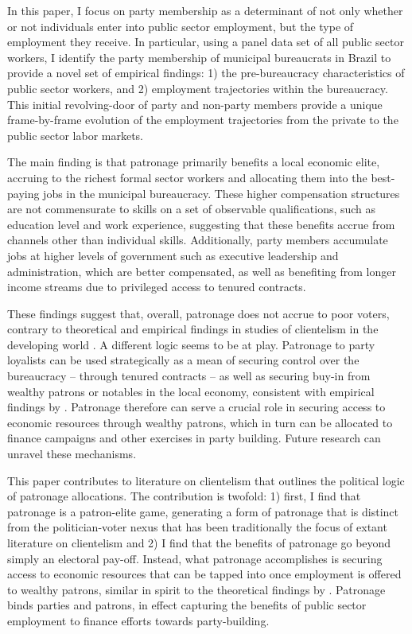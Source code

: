 In this paper, I focus on party membership as a determinant of not only whether or not individuals enter into public sector employment, but the type of employment they receive. In particular, using a panel data set of all public sector workers, I identify the party membership of municipal bureaucrats in Brazil to provide a novel set of empirical findings: 1) the pre-bureaucracy characteristics of public sector workers, and 2) employment trajectories within the bureaucracy. This initial revolving-door of party and non-party members provide a unique frame-by-frame evolution of the employment trajectories from the private to the public sector labor markets.

The main finding is that patronage primarily benefits a local economic elite, accruing to the richest formal sector workers and allocating them into the best-paying jobs in the municipal bureaucracy. These higher compensation structures are not commensurate to skills on a set of observable qualifications, such as education level and work experience, suggesting that these benefits accrue from channels other than individual skills. Additionally, party members accumulate jobs at higher levels of government such as executive leadership and administration, which are better compensated, as well as benefiting from longer income streams due to privileged access to tenured contracts.

These findings suggest that, overall, patronage does not accrue to poor voters, contrary to theoretical and empirical findings in studies of clientelism in the developing world \citep{stokes2013brokers}. A different logic seems to be at play. Patronage to party loyalists can be used strategically as a mean of securing control over the bureaucracy -- through tenured contracts -- as well as securing buy-in from wealthy patrons or notables in the local economy, consistent with empirical findings by \citet{colonnelli2018patronage}. Patronage therefore can serve a crucial role in securing access to economic resources through wealthy patrons, which in turn can be allocated to finance campaigns and other exercises in party building. Future research can unravel these mechanisms.

This paper contributes to literature on clientelism that outlines the political logic of patronage allocations. The contribution is twofold: 1) first, I find that patronage is a patron-elite game, generating a form of patronage that is distinct from the politician-voter nexus that has been traditionally the focus of extant literature on clientelism \citep{stokes2013brokers, diaz2016political} and 2) I find that the benefits of patronage go beyond simply an electoral pay-off. Instead, what patronage accomplishes is securing access to economic resources that can be tapped into once employment is offered to wealthy patrons, similar in spirit to the theoretical findings by \citet{robinson2013political}. Patronage binds parties and patrons, in effect capturing the benefits of public sector employment to finance efforts towards party-building.

